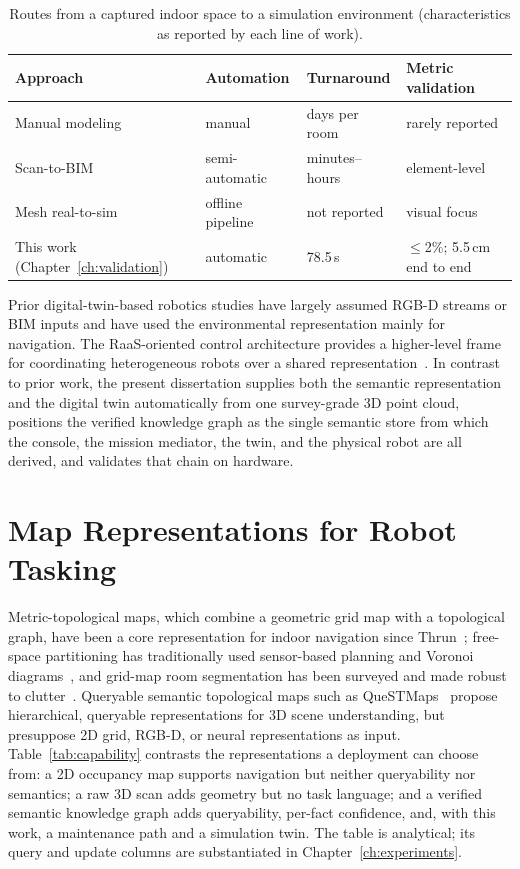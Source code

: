 \begin{table}[htbp]
  \centering
  \caption{Routes from a captured indoor space to a simulation environment
  (characteristics as reported by each line of work).}
  \label{tab:routes}
  \begin{tabularx}{\textwidth}{l l l X}
    \toprule
    \textbf{Approach} & \textbf{Automation} & \textbf{Turnaround} & \textbf{Metric validation} \\
    \midrule
    Manual modeling~\cite{tao2019} & manual & days per room & rarely reported \\
    Scan-to-BIM~\cite{scan2bim} & semi-automatic & minutes--hours & element-level \\
    Mesh real-to-sim~\cite{gibson} & offline pipeline & not reported & visual focus \\
    This work (Chapter~\ref{ch:validation}) & automatic & 78.5\,s & $\le$2\%; 5.5\,cm end to end \\
    \bottomrule
  \end{tabularx}
\end{table}

Prior digital-twin-based robotics studies have largely assumed RGB-D streams
or BIM inputs and have used the environmental representation mainly for
navigation. The RaaS-oriented control architecture provides a higher-level
frame for coordinating heterogeneous robots over a shared
representation~\cite{kwon2025}. In contrast to prior work, the present
dissertation supplies both the semantic representation and the digital twin
automatically from one survey-grade 3D point cloud, positions the verified
knowledge graph as the single semantic store from which the console, the
mission mediator, the twin, and the physical robot are all derived, and
validates that chain on hardware.

\section{Map Representations for Robot Tasking}
\label{sec:rw-representations}

Metric-topological maps, which combine a geometric grid map with a topological
graph, have been a core representation for indoor navigation since
Thrun~\cite{thrun1998}; free-space partitioning has traditionally used
sensor-based planning and Voronoi diagrams~\cite{choset1996}, and grid-map
room segmentation has been surveyed and made robust to
clutter~\cite{bormann2016room,luperto2022robust}. Queryable semantic
topological maps such as QueSTMaps~\cite{mehan2024} propose hierarchical,
queryable representations for 3D scene understanding, but presuppose 2D grid,
RGB-D, or neural representations as input. Table~\ref{tab:capability}
contrasts the representations a deployment can choose from: a 2D occupancy map
supports navigation but neither queryability nor semantics; a raw 3D scan adds
geometry but no task language; and a verified semantic knowledge graph adds
queryability, per-fact confidence, and, with this work, a maintenance path and a
simulation twin. The table is analytical; its query and update columns are
substantiated in Chapter~\ref{ch:experiments}.

